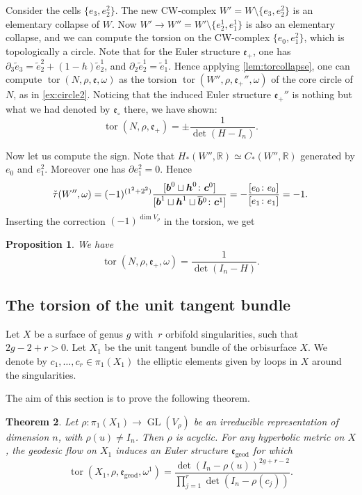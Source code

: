 \documentclass[JEP,XML,SOM,Unicode,NoFloatCountersInSection,published]{cedram}
\theoremstyle{plain}
\newtheorem{thm}{Theorem}[subsection]
\newtheorem{prop}[thm]{Proposition}
\theoremstyle{definition}
\theoremstyle{remark}
\newcommand{\R}{\mathbb{R}}
\newcommand{\geod}{\mathrm{geod}}
\DeclareMathOperator{\GL}{GL}
\numberwithin{equation}{section}
\DeclareMathOperator{\tor}{tor}
\begin{document}
Consider the cells $\{e_3, e_2^2\}$. The new CW-complex $W' = W \setminus \{e_3, e_2^2\}$ is an elementary collapse of $W$. Now $W' \to W'' = W' \setminus \{e_2^1, e_1^1\}$ is also an elementary collapse, and we can compute the torsion on the CW-complex $\{e_0, e_1^2\}$, which is topologically a circle.
Note that for the Euler structure $\mathfrak e_+$, one has $\partial_3 \widetilde e_3 = \widetilde e_2^2 + (1-h) \widetilde e_2^1$, and $\partial_2 \widetilde e_2^1 = \widetilde e_1^1$. Hence applying \cref{lem:torcollapse}, one can compute $\tor(N, \rho, \mathfrak e, \omega)$ as the torsion $\tor(W'', \rho, \mathfrak e_+'', \omega)$ of the core circle of $N$, as in \cref{ex:circle2}. Noticing that the induced Euler structure $\mathfrak e_+''$ is nothing but what we had denoted by $\mathfrak e_\circ$ there, we have shown:
\[
\tor(N,\rho, \mathfrak e_+) = \pm \frac 1 {\det(H -I_n)}.
\]

Now let us compute the sign. Note that $H_*(W'', \R) \simeq C_*(W'', \R)$ generated by $e_0$ and $e_1^2$. Moreover one has $\partial e_1^2 = 0$. Hence
\[
\check \tau(W'', \omega)= (-1)^{(1^2 + 2^2)} \frac{[\boldsymbol b^0 \sqcup \boldsymbol h^0 \colon \boldsymbol c^0]}{[\boldsymbol b^1 \sqcup \boldsymbol h^1 \sqcup \boldsymbol{\overline b}{}^0 \colon \boldsymbol c^1]}\\
=- \frac {[e_0\colon e_0]}{[e_1 \colon e_1]} = -1.
\]
Inserting the correction $(-1)^{\dim V_\rho}$ in the torsion, we get
\begin{prop}
\label{prop:torstorus}
We have
\[
\tor(N,\rho, \mathfrak e_+, \omega) = \dfrac 1 {\det(I_n - H)}.
\]
\end{prop}

\subsection{The torsion of the unit tangent bundle}
\label{subsec:Torsion}
Let $X$
be a surface of genus $g$ with~$r$ orbifold singularities, such that $2g-2+r>0$. Let $X_1$
be the unit tangent bundle of the orbisurface $X$. We denote by $c_1, \ldots, c_r\in\pi_1(X_1)$ the elliptic elements given by loops in $X$ around the singularities.

The aim of this section is to prove the following theorem.
\begin{thm}
\label{prop:torsion}
Let $\rho \colon \pi_1(X_1) \!\to\! \GL(V_\rho)$ be an irreducible representation of dimen\-sion $n$, with $\rho(u) \neq I_n$. Then $\rho$ is acyclic. For any hyperbolic metric on $X$, the geodesic flow on $X_1$ induces an Euler structure $\mathfrak e_{\geod}$ for which
\[
\tor(X_1, \rho, \mathfrak e_{\geod}, \omega^1) = \frac{\det(I_n - \rho(u))^{2g+r-2}}{\prod_{j=1}^r \det(I_n - \rho(c_j))}.
\]
\end{thm}
\end{document}
